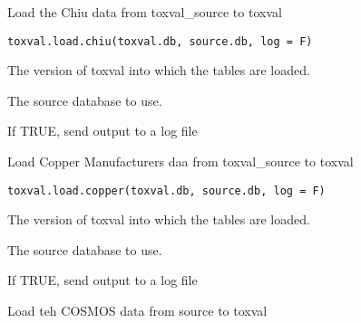 \documentclass[letterpaper]{book}
\begin{document}
%
\begin{Description}\relax
Load the Chiu data from toxval\_source to toxval
\end{Description}
%
\begin{Usage}
\begin{verbatim}
toxval.load.chiu(toxval.db, source.db, log = F)
\end{verbatim}
\end{Usage}
%
\begin{Arguments}
\begin{ldescription}
\item[\code{toxval.db}] The version of toxval into which the tables are loaded.

\item[\code{source.db}] The source database to use.

\item[\code{log}] If TRUE, send output to a log file
\end{ldescription}
\end{Arguments}
%
\begin{Description}\relax
Load Copper Manufacturers daa from toxval\_source to toxval
\end{Description}
%
\begin{Usage}
\begin{verbatim}
toxval.load.copper(toxval.db, source.db, log = F)
\end{verbatim}
\end{Usage}
%
\begin{Arguments}
\begin{ldescription}
\item[\code{toxval.db}] The version of toxval into which the tables are loaded.

\item[\code{source.db}] The source database to use.

\item[\code{log}] If TRUE, send output to a log file
\end{ldescription}
\end{Arguments}
%
\begin{Description}\relax
Load teh COSMOS data from source to toxval
\end{Description}
\end{document}

